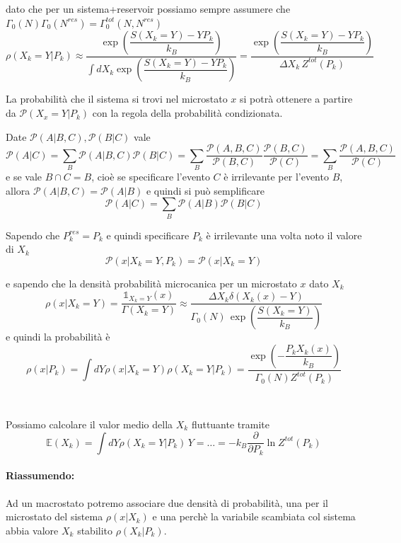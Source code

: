 \documentclass[11pt,a4paper,twoside]{book}
\newenvironment{esempio}[1][Esempio]{ 
  \begin{center}\begin{tcolorbox}[
  title={#1:\\},
  width=0.9\linewidth,
  flush right,
  enhanced jigsaw, 
  colback=white, 
  frame hidden, 
  sharpish corners, arc=3mm,
  borderline west = {1pt}{0pt}{gray},
  borderline south = {1pt}{0pt}{gray},
  coltitle=black, 
  fonttitle=\small\bfseries, 
  attach title to upper, 
  breakable,
  top=2.5pt, bottom=0.3pt]\small
  }{
 \normalsize \end{tcolorbox}\end{center}
}
\numberwithin{equation}{section} %
\begin{document}
dato che per un sistema+reservoir possiamo sempre assumere che $\Gamma_0(N)\Gamma_0(N^{res})=\Gamma_0^{tot}(N,N^{res})$
\begin{equation}
\rho(X_k=Y|P_k) \approx \dfrac{\exp{\left( \dfrac{S(X_k=Y)-YP_k}{k_B} \right)} }{\displaystyle\int dX_k \exp{\left( \dfrac{S(X_k=Y)-YP_k}{k_B} \right)}} = 
\dfrac{\exp{\left( \dfrac{S(X_k=Y)-YP_k}{k_B} \right)} }{\Delta X_k \,Z^{tot}(P_k)}
\end{equation}

La probabilità che il sistema si trovi nel microstato $x$ si potrà ottenere a partire da $\mathcal{P}(X_x=Y|P_k)$ con la regola della probabilità condizionata.

\begin{esempio}[Probabilità condizionata]
Date $\mathcal{P}(A|B,C), \mathcal{P}(B|C)$ vale 
\[
\mathcal{P}(A|C)=\sum_B \mathcal{P}(A|B,C)\mathcal{P}(B|C) = 
\sum_B \dfrac{\mathcal{P}(A,B,C)}{\mathcal{P}(B,C)} \dfrac{\mathcal{P}(B,C)}{\mathcal{P}(C)} = 
\sum_B \dfrac{\mathcal{P}(A,B,C)}{\mathcal{P}(C)}
\]
e se vale $B\cap C= B$, cioè se specificare l'evento $C$ è irrilevante per l'evento $B$, allora $\mathcal{P}(A|B,C)=\mathcal{P}(A|B)$ e quindi si può semplificare
\[
\mathcal{P}(A|C)=\sum_B \mathcal{P}(A|B)\mathcal{P}(B|C)
\]
\end{esempio}

Sapendo che $P_k^{res}=P_k$ e quindi specificare $P_k$ è irrilevante una volta noto il valore di $X_k$
\[
\mathcal{P}(x|X_k=Y,P_k)=\mathcal{P}(x|X_k=Y)
\]

e sapendo che la densità probabilità microcanica per un microstato $x$ dato $X_k$
\[
\rho(x|X_k=Y)= \dfrac{\mathbb{1}_{X_k=Y}(x)}{\Gamma(X_k=Y)}\approx\dfrac{\Delta X_k \delta(X_k(x)-Y)}{\Gamma_0(N)\,\exp{\left(\dfrac{S(X_k=Y)}{k_B}\right)}}
\]
e quindi la probabilità è
\begin{equation}\label{densitàProbabilitàMicrostatoP}
\rho(x|P_k)=\int dY \rho(x|X_k=Y)\rho(X_k=Y|P_k)=\dfrac{\exp{\left(-\dfrac{P_kX_k(x)}{k_B} \right)} }{\Gamma_0(N)Z^{tot}(P_k)}
\end{equation}

\par~\par

Possiamo calcolare il valor medio della $X_k$ fluttuante tramite
\[
\mathbb{E}(X_k)=\int dY \rho(X_k=Y|P_k)\,Y=\dots=-k_B\dfrac{\partial}{\partial P_k}\ln Z^{tot}(P_k)
\]


\paragraph{Riassumendo:} Ad un macrostato potremo associare due densità di probabilità, una per il microstato del sistema $\rho(x|X_k)$ e una perchè la variabile scambiata col sistema abbia valore $X_k$ stabilito $\rho(X_k|P_k)$.
\end{document}
